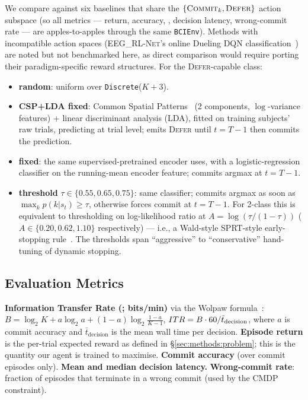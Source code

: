 We compare against six baselines that share the
$\{\textsc{Commit}_k, \textsc{Defer}\}$ action subspace (so all metrics
--- return, accuracy, \itr{}, decision latency, wrong-commit rate ---
are apples-to-apples through the same \texttt{BCIEnv}). Methods with
incompatible action spaces (\textsc{EEG\_RL-Net}'s online Dueling
DQN classification~\cite{Aung2024EEG_RL_Net}) are noted but not
benchmarked here, as direct comparison would require porting their
paradigm-specific reward structures. For the \textsc{Defer}-capable
class:
\begin{itemize}
\item \textbf{random}: uniform over \texttt{Discrete}($K + 3$).
\item \textbf{CSP+LDA fixed}: Common Spatial Patterns~\cite{Ang2008FBCSP}
(2 components, $\log$-variance features) + linear discriminant
analysis (LDA), fitted on
training subjects' raw trials, predicting at trial level; emits
\textsc{Defer} until $t = T - 1$ then commits the prediction.
\item \textbf{\eegnet{} fixed}: the same supervised-pretrained \eegnet{}
encoder \nettype{} uses, with a logistic-regression classifier on the
running-mean encoder feature; commits argmax at $t = T - 1$.
\item \textbf{\eegnet{} threshold} $\tau \in \{0.55, 0.65, 0.75\}$: same
classifier; commits argmax as soon as $\max_k p(k|s_t) \ge \tau$,
otherwise forces commit at $t = T - 1$. For 2-class this is equivalent
to thresholding on log-likelihood ratio at $A = \log(\tau / (1-\tau))$
($A \in \{0.20, 0.62, 1.10\}$ respectively) --- i.e., a Wald-style
SPRT-style early-stopping
rule~\cite{Liu2017MotorImageryBTSPRT}. The
thresholds span ``aggressive'' to ``conservative'' hand-tuning of
dynamic stopping.
\end{itemize}

\subsection{Evaluation Metrics}\label{sec:methods:metrics}

\textbf{Information Transfer Rate (\itr{}; bits/min)} via the
Wolpaw formula~\cite{Wolpaw2002ITR}:
$B = \log_2 K + a \log_2 a + (1-a) \log_2 \frac{1-a}{K-1}$,
$ITR{} = B \cdot 60 / \bar t_{\text{decision}}$,
where $a$ is commit accuracy and $\bar t_{\text{decision}}$ is the mean
wall time per decision. \textbf{Episode return} is the per-trial
expected reward as defined in \S\ref{sec:methods:problem}; this is the
quantity our agent is trained to maximise. \textbf{Commit accuracy}
(over commit episodes only). \textbf{Mean and median decision latency.}
\textbf{Wrong-commit rate}: fraction of episodes that terminate in a
wrong commit (used by the CMDP constraint).
